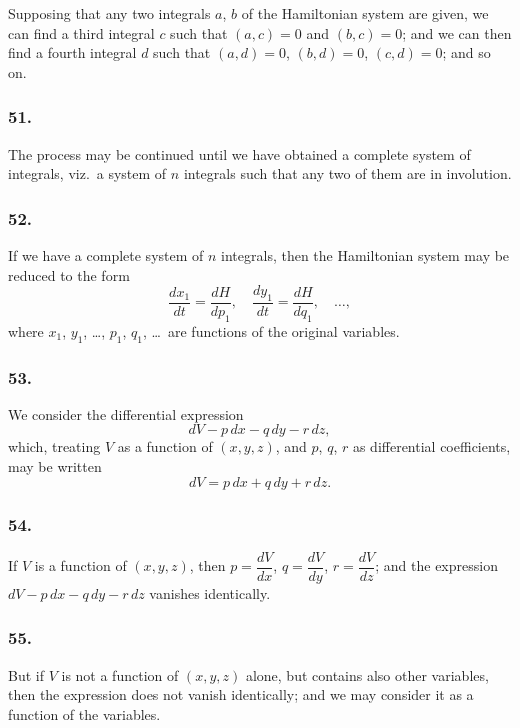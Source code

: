 \documentclass[12pt,a4paper]{article}
\theoremstyle{plain}
\begin{document}
Supposing that any two integrals $a$, $b$ of the Hamiltonian system are given, we can find a third integral $c$ such that $(a, c) = 0$ and $(b, c) = 0$; and we can then find a fourth integral $d$ such that $(a, d) = 0$, $(b, d) = 0$, $(c, d) = 0$; and so on.

\subsubsection*{51.}

The process may be continued until we have obtained a complete system of integrals, viz.~a system of $n$ integrals such that any two of them are in involution.

\subsubsection*{52.}

If we have a complete system of $n$ integrals, then the Hamiltonian system may be reduced to the form
\[
\frac{dx_{1}}{dt} = \frac{dH}{dp_{1}}, \quad \frac{dy_{1}}{dt} = \frac{dH}{dq_{1}}, \quad \ldots,
\]
where $x_{1}$, $y_{1}$, \ldots, $p_{1}$, $q_{1}$, \ldots\ are functions of the original variables.

\newpage
\setcounter{page}{136}

\subsubsection*{53.}

We consider the differential expression
\[
dV - p\,dx - q\,dy - r\,dz,
\]
which, treating $V$ as a function of $(x, y, z)$, and $p$, $q$, $r$ as differential coefficients, may be written
\[
dV = p\,dx + q\,dy + r\,dz.
\]

\subsubsection*{54.}

If $V$ is a function of $(x, y, z)$, then $p = \dfrac{dV}{dx}$, $q = \dfrac{dV}{dy}$, $r = \dfrac{dV}{dz}$; and the expression $dV - p\,dx - q\,dy - r\,dz$ vanishes identically.

\subsubsection*{55.}

But if $V$ is not a function of $(x, y, z)$ alone, but contains also other variables, then the expression does not vanish identically; and we may consider it as a function of the variables.
\end{document}
